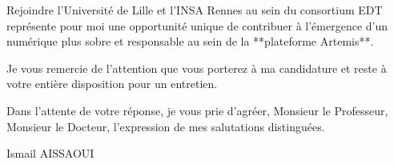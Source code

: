\documentclass[11pt,a4paper]{article}
\begin{document}
Rejoindre l'Université de Lille et l'INSA Rennes au sein du consortium EDT représente pour moi une opportunité unique de contribuer à l'émergence d'un numérique plus sobre et responsable au sein de la **plateforme Artemis**.

Je vous remercie de l'attention que vous porterez à ma candidature et reste à votre entière disposition pour un entretien.

Dans l'attente de votre réponse, je vous prie d'agréer, Monsieur le Professeur, Monsieur le Docteur, l'expression de mes salutations distinguées.

\bigskip

\noindent Ismail AISSAOUI
\end{document}
